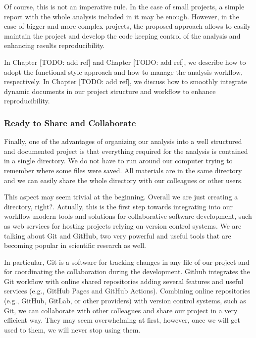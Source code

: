 \documentclass[
  11pt,
]{book}
\begin{document}
Of course, this is not an imperative rule. In the case of small projects, a simple report with the whole analysis included in it may be enough. However, in the case of bigger and more complex projects, the proposed approach allows to easily maintain the project and develop the code keeping control of the analysis and enhancing results reproducibility.

In Chapter {[}TODO: add ref{]} and Chapter {[}TODO: add ref{]}, we describe how to adopt the functional style approach and how to manage the analysis workflow, respectively. In Chapter {[}TODO: add ref{]}, we discuss how to smoothly integrate dynamic documents in our project structure and workflow to enhance reproducibility.

\hypertarget{ready-to-share-and-collaborate}{%
\subsubsection{Ready to Share and Collaborate}\label{ready-to-share-and-collaborate}}

Finally, one of the advantages of organizing our analysis into a well structured and documented project is that everything required for the analysis is contained in a single directory. We do not have to run around our computer trying to remember where some files were saved. All materials are in the same directory and we can easily share the whole directory with our colleagues or other users.

This aspect may seem trivial at the beginning. Overall we are just creating a directory, right?. Actually, this is the first step towards integrating into our workflow modern tools and solutions for collaborative software development, such as web services for hosting projects relying on version control systems. We are talking about Git and GitHub, two very powerful and useful tools that are becoming popular in scientific research as well.

In particular, Git is a software for tracking changes in any file of our project and for coordinating the collaboration during the development. Github integrates the Git workflow with online shared repositories adding several features and useful services (e.g., GitHub Pages and GitHub Actions). Combining online repositories (e.g., GitHub, GitLab, or other providers) with version control systems, such as Git, we can collaborate with other colleagues and share our project in a very efficient way. They may seem overwhelming at first, however, once we will get used to them, we will never stop using them.
\end{document}
